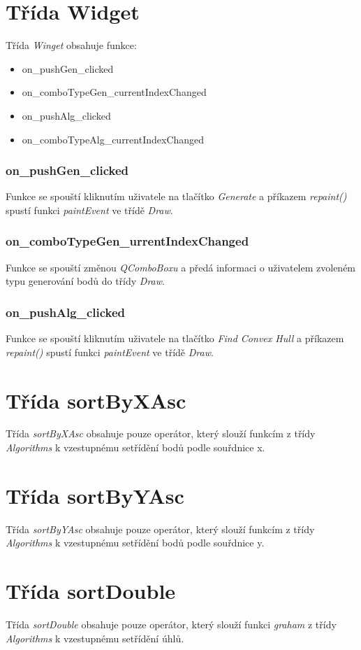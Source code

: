 \documentclass{article}
\begin{document}
\section{Třída Widget}
Třída \emph{Winget} obsahuje funkce:
\begin{itemize}
\item on\_pushGen\_clicked
\item on\_comboTypeGen\_currentIndexChanged
\item on\_pushAlg\_clicked
\item on\_comboTypeAlg\_currentIndexChanged
\end{itemize}

\subsubsection{on\_pushGen\_clicked}
Funkce se spouští kliknutím uživatele na tlačítko \emph{Generate} a příkazem \emph{repaint()} spustí funkci \emph{paintEvent} ve třídě \emph{Draw}.

\subsubsection{on\_comboTypeGen\_urrentIndexChanged}
Funkce se spouští změnou \emph{QComboBoxu} a předá informaci o uživatelem zvoleném typu generování bodů do třídy \emph{Draw}.

\subsubsection{on\_pushAlg\_clicked}
Funkce se spouští kliknutím uživatele na tlačítko \emph{Find Convex Hull} a příkazem \emph{repaint()} spustí funkci \emph{paintEvent} ve třídě \emph{Draw}.

\section{Třída sortByXAsc}
Třída \emph{sortByXAsc} obsahuje pouze operátor, který slouží funkcím z třídy \emph{Algorithms} k vzestupnému setřídění bodů podle souřdnice x.

\section{Třída sortByYAsc}
Třída \emph{sortByYAsc} obsahuje pouze operátor, který slouží funkcím z třídy \emph{Algorithms} k vzestupnému setřídění bodů podle souřdnice y.

\section{Třída sortDouble}
Třída \emph{sortDouble} obsahuje pouze operátor, který slouží funkci \emph{graham} z třídy \emph{Algorithms} k vzestupnému setřídění úhlů.
\end{document}
